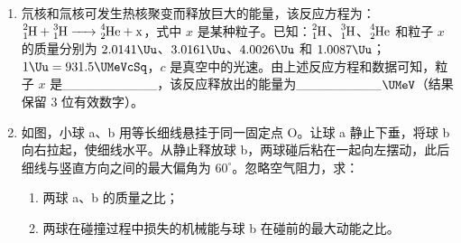 \documentclass[\gkver]{gaokaozhenti}
\begin{document}
\begin{enumerate}
{由题给数据得 $R_{A}=\frac{a}{2}$ ⑤

由题意，上表面所镀的面积最小的不透明薄膜应是半径为 $R_{A}$ 的圆。所求的镀膜面积 $S'$ 与玻璃立方体的表面积 $S$ 之比为

$\frac{S'}{S}=\frac{6\pi R_{A}^{2}}{6a^{2}}$ ⑥

由⑤⑥式得 $\frac{S'}{S}=\frac{\pi}{4}$ ⑦
}

\item
氘核和氚核可发生热核聚变而释放巨大的能量，该反应方程为：$\ce{^{2}_{1}H + ^{3}_{1}H -> ^{4}_{2}He + x}$，式中 $x$ 是某种粒子。已知：$\ce{^{2}_{1}H}$、$\ce{^{3}_{1}H}$、$\ce{^{4}_{2}He}$ 和粒子 $x$ 的质量分别为 $2.0141\Uu$、$3.0161\Uu$、$4.0026\Uu$ 和 $1.0087\Uu$；$1\Uu=931.5\UMeVcSq$，$c$ 是真空中的光速。由上述反应方程和数据可知，粒子 $x$ 是\_\_\_\_\_\_\_\_\_\_，该反应释放出的能量为\_\_\_\_\_\_\_\_\_$\UMeV$（结果保留 3 位有效数字）。

\item
如图，小球 a、b 用等长细线悬挂于同一固定点 O。让球 a 静止下垂，将球 b 向右拉起，使细线水平。从静止释放球 b，两球碰后粘在一起向左摆动，此后细线与竖直方向之间的最大偏角为 $60^{\circ}$。忽略空气阻力，求：
\begin{enumerate}
	\item
	两球 a、b 的质量之比；
	\item
	两球在碰撞过程中损失的机械能与球 b 在碰前的最大动能之比。
\end{enumerate}
\end{enumerate}
\end{document}
